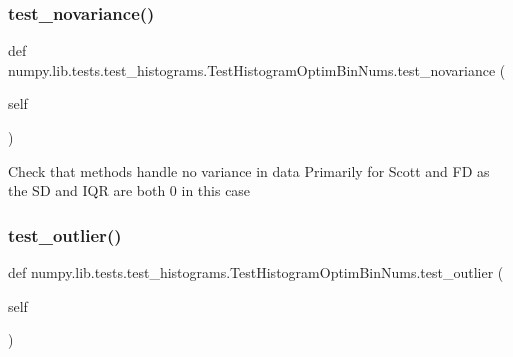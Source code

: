 \subsubsection{\texorpdfstring{test\+\_\+novariance()}{test\_novariance()}}
{\footnotesize\ttfamily def numpy.\+lib.\+tests.\+test\+\_\+histograms.\+Test\+Histogram\+Optim\+Bin\+Nums.\+test\+\_\+novariance (\begin{DoxyParamCaption}\item[{}]{self }\end{DoxyParamCaption})}

\begin{DoxyVerb}Check that methods handle no variance in data
Primarily for Scott and FD as the SD and IQR are both 0 in this case
\end{DoxyVerb}
 \mbox{\label{classnumpy_1_1lib_1_1tests_1_1test__histograms_1_1TestHistogramOptimBinNums_a556728119a01e70af38b7b7b2028c760}} 
\subsubsection{\texorpdfstring{test\+\_\+outlier()}{test\_outlier()}}
{\footnotesize\ttfamily def numpy.\+lib.\+tests.\+test\+\_\+histograms.\+Test\+Histogram\+Optim\+Bin\+Nums.\+test\+\_\+outlier (\begin{DoxyParamCaption}\item[{}]{self }\end{DoxyParamCaption})}

